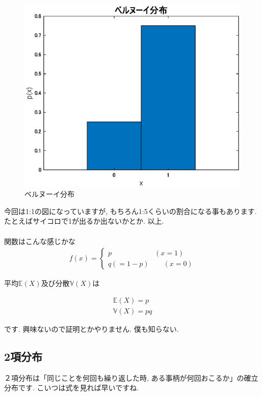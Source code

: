 \documentclass[11pt,a4paper,uplatex]{ujreport} 	%
\begin{document}
\begin{figure}[H]
\label{im:bernoulli}
  \centering
  \includegraphics[width=15cm]{../figures/bernouli.eps}
  \caption{ベルヌーイ分布}
\end{figure}

今回は1:1の図になっていますが, もちろん1:5くらいの割合になる事もあります. たとえばサイコロで1が出るか出ないかとか. 以上.\\
\\

関数はこんな感じかな
\begin{align}
f(x)=
  \left\{
    \begin{array}{l}
      p \qquad \qquad \qquad (x = 1) \\
      q(=1-p)  \qquad (x=0)
    \end{array}
  \right.
\end{align}

平均$\mathbb{E}(X)$及び分散$\mathbb{V}(X)$は

\begin{align}
\mathbb{E}(X) = p\\
\mathbb{V}(X) = pq
\end{align}

です. 興味ないので証明とかやりません. 僕も知らない.
\subsection{2項分布}
２項分布は「同じことを何回も繰り返した時, ある事柄が何回おこるか」の確立分布です. こいつは式を見れば早いですね.
\end{document}
